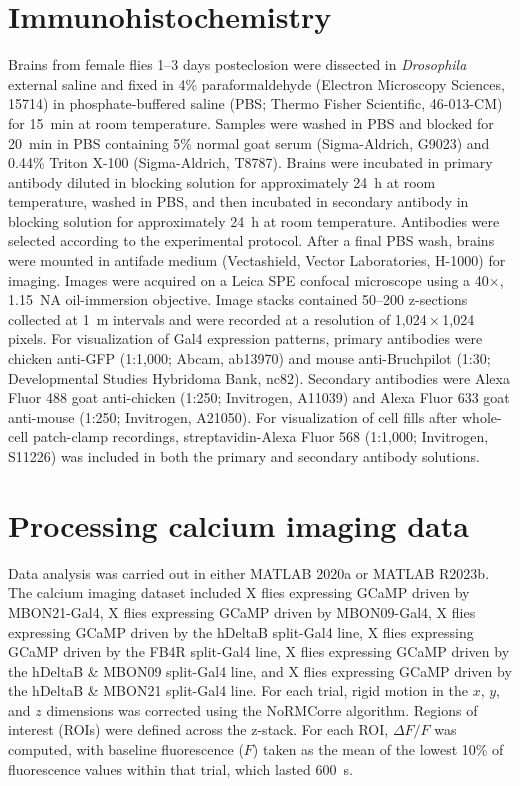 \section{Immunohistochemistry}

Brains from female flies 1--3 days posteclosion were dissected in \textit{Drosophila} external saline and fixed in 4\% paraformaldehyde (Electron Microscopy Sciences, 15714) in phosphate-buffered saline (PBS; Thermo Fisher Scientific, 46-013-CM) for 15~min at room temperature. Samples were washed in PBS and blocked for 20~min in PBS containing 5\% normal goat serum (Sigma-Aldrich, G9023) and 0.44\% Triton X-100 (Sigma-Aldrich, T8787). Brains were incubated in primary antibody diluted in blocking solution for approximately 24~h at room temperature, washed in PBS, and then incubated in secondary antibody in blocking solution for approximately 24~h at room temperature. Antibodies were selected according to the experimental protocol. After a final PBS wash, brains were mounted in antifade medium (Vectashield, Vector Laboratories, H-1000) for imaging. Images were acquired on a Leica SPE confocal microscope using a 40$\times$, 1.15~NA oil-immersion objective. Image stacks contained 50--200 z-sections collected at 1~\textmu m intervals and were recorded at a resolution of 1,024\,$\times$\,1,024 pixels. For visualization of Gal4 expression patterns, primary antibodies were chicken anti-GFP (1:1,000; Abcam, ab13970) and mouse anti-Bruchpilot (1:30; Developmental Studies Hybridoma Bank, nc82). Secondary antibodies were Alexa Fluor 488 goat anti-chicken (1:250; Invitrogen, A11039) and Alexa Fluor 633 goat anti-mouse (1:250; Invitrogen, A21050). For visualization of cell fills after whole-cell patch-clamp recordings, streptavidin-Alexa Fluor 568 (1:1,000; Invitrogen, S11226) was included in both the primary and secondary antibody solutions.

\section{Processing calcium imaging data}

Data analysis was carried out in either MATLAB 2020a or MATLAB R2023b. The calcium imaging dataset included X flies expressing GCaMP driven by MBON21-Gal4, X flies expressing GCaMP driven by MBON09-Gal4, X flies expressing GCaMP driven by the hDeltaB split-Gal4 line, X flies expressing GCaMP driven by the FB4R split-Gal4 line, X flies expressing GCaMP driven by the hDeltaB \& MBON09 split-Gal4 line, and X flies expressing GCaMP driven by the hDeltaB \& MBON21 split-Gal4 line. For each trial, rigid motion in the $x$, $y$, and $z$ dimensions was corrected using the NoRMCorre algorithm. Regions of interest (ROIs) were defined across the z-stack. For each ROI, $\Delta F/F$ was computed, with baseline fluorescence ($F$) taken as the mean of the lowest 10\% of fluorescence values within that trial, which lasted 600~s.

